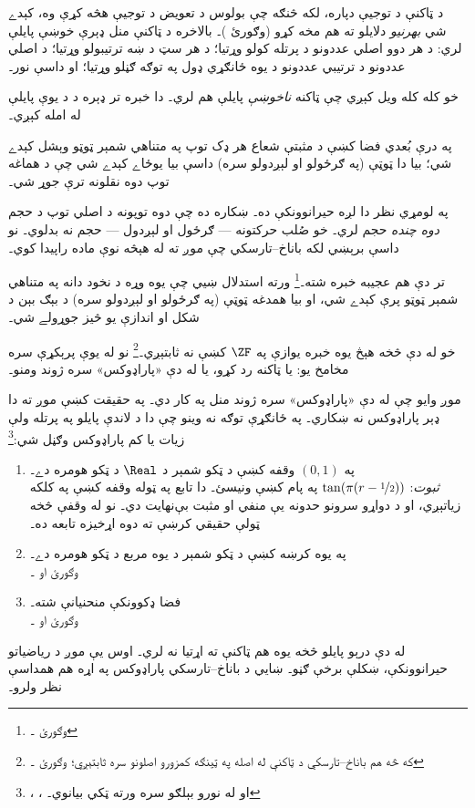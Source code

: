 \documentclass[../../../include/open-logic-section]{subfiles}
\begin{document}

د ټاکنې د توجيې دپاره، لکه څنګه چې بولوس د تعويض د
توجيې هڅه کړې وه، کېدے شي \emph{بهرنيو} دلايلو ته هم مخه کړو
(وګورئ )۔ بالاخره د ټاکنې منل
ډېرې خوښې پايلې لري: د هر دوو اصلي عددونو د پرتله کولو وړتيا؛
د هر سټ د ښه ترتيبولو وړتيا؛ د اصلي عددونو د ترتيبي عددونو د
يوه ځانګړي ډول په توګه ګڼلو وړتيا؛ او داسې نور۔

خو کله کله ويل کېږي چې ټاکنه \emph{ناخوښې} پايلې هم لري۔
دا خبره تر ډېره د \cite{BanachTarski1924} د يوې پايلې له امله کېږي۔

\begin{thm}
په درې بُعدي فضا کښې د مثبتې شعاع هر ډک توپ په متناهي شمېر ټوټو وېشل کېدے شي؛ بيا دا ټوټې
(په ګرځولو او لېږدولو سره) داسې بيا يوځاے کېدے شي چې
د هماغه توپ دوه نقلونه ترې جوړ شي۔
\end{thm}
\noindent
په لومړي نظر دا لږه حيرانوونکې ده۔ ښکاره ده چې دوه توپونه
د اصلي توپ د حجم \emph{دوه چنده} حجم لري۔ خو صُلب حرکتونه ---
ګرځول او لېږدول --- حجم نه بدلوي۔ نو داسې برېښي لکه
باناخ--تارسکي چې موږ ته له هېڅه نوې ماده راپيدا کوي۔

تر دې هم عجيبه خبره شته۔\footnote{وګورئ \citet[Theorem 3.12]{Wagon2016}۔}
ورته استدلال ښيي چې يوه وړه د نخود دانه په متناهي شمېر ټوټو
پرې کېدے شي، او بيا همدغه ټوټې (په ګرځولو او لېږدولو سره)
د بېګ بېن د شکل او اندازې يو څيز جوړولے شي۔

خو له دې څخه هېڅ يوه خبره يوازې په $\ZF$ کښې نه ثابتېږي۔\footnote{که څه هم
باناخ--تارسکي د ټاکنې له اصله په ټينګه کمزورو اصلونو سره
ثابتېږي؛ وګورئ \citet[303]{Wagon2016}۔} نو له يوې پرېکړې سره
مخامخ يو: يا ټاکنه رد کړو، يا له دې «پاراډوکس» سره ژوند ومنو۔

موږ وايو چې له دې «پاراډوکس» سره ژوند منل په کار دي۔ په
حقيقت کښې موږ ته دا ډېر پاراډوکس نه ښکاري۔ په ځانګړې توګه
نه وينو چې دا د لاندې پايلو په پرتله ولې زيات يا کم پاراډوکس
وګڼل شي:\footnote{\citet[276--7]{Potter2004}،
\citet[16]{Weston2003}، او \citet[31, 308--9]{Wagon2016}
له نورو بېلګو سره ورته ټکي بيانوي۔}
\begin{enumerate}
	\item په $(0,1)$ وقفه کښې د ټکو شمېر د $\Real$ د ټکو هومره دے۔
	\\\emph{ثبوت}: $\tan(\pi(r-\nicefrac{1}{2}))$ په پام کښې ونيسئ۔ دا تابع په ټوله وقفه کښې په کلکه زياتېږي، او د دواړو سرونو حدونه يې منفي او مثبت بې‌نهايت دي۔ نو له وقفې څخه ټولې حقيقي کرښې ته دوه اړخيزه تابعه ده۔
	\item په يوه کرښه کښې د ټکو شمېر د يوه مربع د ټکو هومره دے۔
	\\وګورئ  او ۔
	\item فضا ډکوونکې منحنيانې شته۔
	\\وګورئ  او ۔
\end{enumerate}
له دې درېو پايلو څخه يوه هم ټاکنې ته اړتيا نه لري۔ اوس
يې موږ د رياضياتو حيرانوونکې، ښکلې برخې ګڼو۔ ښايي د
باناخ--تارسکي پاراډوکس په اړه هم همداسې نظر ولرو۔
\end{document}
